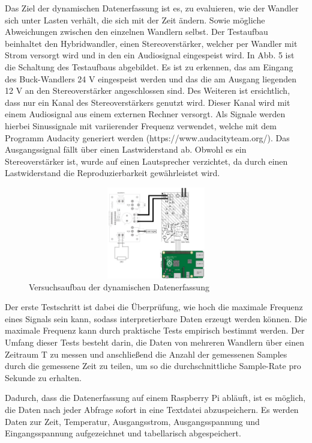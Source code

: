 Das Ziel der dynamischen Datenerfassung ist es, zu evaluieren, wie der Wandler sich unter Lasten verhält, die sich mit der Zeit ändern. Sowie mögliche Abweichungen zwischen den einzelnen Wandlern selbst. Der Testaufbau beinhaltet den Hybridwandler, einen Stereoverstärker, welcher per Wandler mit Strom versorgt wird und in den ein Audiosignal eingespeist wird. In Abb. 5 ist die Schaltung des Testaufbaus abgebildet. Es ist zu erkennen, das am Eingang des Buck-Wandlers 24 V eingespeist werden und das die am Ausgang liegenden 12 V an den Stereoverstärker angeschlossen sind. Des Weiteren ist ersichtlich, dass nur ein Kanal des Stereoverstärkers genutzt wird. Dieser Kanal wird mit einem Audiosignal aus einem externen Rechner versorgt. Als Signale werden hierbei Sinussignale mit variierender Frequenz verwendet, welche mit dem Programm Audacity generiert werden (https://www.audacityteam.org/). Das Ausgangssignal fällt über einen Lastwiderstand ab. Obwohl es ein Stereoverstärker ist, wurde auf einen Lautsprecher verzichtet, da durch einen Lastwiderstand die Reproduzierbarkeit gewährleistet wird. 


\begin{figure}[H]
    \centering
    \includegraphics[height= 4cm, width = 12cm]{Pictures/Dyn_Schaltung.jpg}
    \caption{Versuchsaufbau der dynamischen Datenerfassung}
\end{figure}

Der erste Testschritt ist dabei die Überprüfung, wie hoch die maximale Frequenz eines Signals sein kann, sodass interpretierbare Daten erzeugt werden können. Die maximale Frequenz kann durch praktische Tests empirisch bestimmt werden. Der Umfang dieser Tests besteht darin, die Daten von mehreren Wandlern über einen Zeitraum T zu messen und anschließend die Anzahl der gemessenen Samples durch die gemessene Zeit zu teilen, um so die durchschnittliche Sample-Rate pro Sekunde zu erhalten. 

Dadurch, dass die Datenerfassung auf einem Raspberry Pi abläuft, ist es möglich, die Daten nach jeder Abfrage sofort in eine Textdatei abzuspeichern. Es werden Daten zur Zeit, Temperatur, Ausgangsstrom, Ausgangsspannung und Eingangsspannung aufgezeichnet und tabellarisch abgespeichert.


